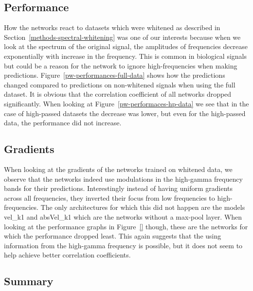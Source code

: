 \subsection{Performance}\label{subsec:pw-performance}
How the networks react to datasets which were whitened as described in Section~\ref{methods-spectral-whitening} was one of our interests because when we look at the spectrum of the original signal, the amplitudes of frequencies decrease exponentially with increase in the frequency.
This is common in biological signals but could be a reason for the network to ignore high-frequencies when making predictions. Figure~\ref{pw-performances-full-data} shows how the predictions changed compared to predictions on non-whitened signals when using the full dataset.
It is obvious that the correlation coefficient of all networks dropped significantly. When looking at Figure~\ref{pw-performaces-hp-data} we see that in the case of high-passed datasets the decrease was lower, but even for the high-passed data, the performance did not increase.

\subsection{Gradients}\label{subsec:pw-gradients2}

When looking at the gradients of the networks trained on whitened data, we observe that the networks indeed use modulations in the high-gamma frequency bands for their predictions.
Interestingly instead of having uniform gradients across all frequencies, they inverted their focus from low frequencies to high-frequencies.
The only architectures for which this did not happen are the models vel\_k1 and absVel\_k1 which are the networks without a max-pool layer.
When looking at the performance graphs in Figure~\ref{} though, these are the networks for which the performance dropped least.
This again suggests that the using information from the high-gamma frequency is possible, but it does not seem to help achieve better correlation coefficients.

\subsection{Summary}\label{subsec:pw-summary}